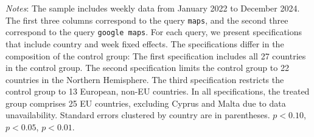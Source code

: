 \documentclass[11pt]{article}
\begin{document}
\begin{table}[!ht]
\begin{threeparttable}
			\begin{tablenotes}
				\item \footnotesize \emph{Notes}: The sample includes weekly data from January 2022 to December 2024. The first three columns correspond to the query \texttt{maps}, and the second three correspond to the query \texttt{google maps}. For each query, we present specifications that include country and week fixed effects. The specifications differ in the composition of the control group: The first specification includes all 27 countries in the control group. The second specification limits the control group to 22 countries in the Northern Hemisphere. The third specification restricts the control group to 13 European, non-EU countries. In all specifications, the treated group comprises 25 EU countries, excluding Cyprus and Malta due to data unavailability. Standard errors clustered by country are in parentheses. \sym{*} \(p<0.10\), \sym{**} \(p<0.05\), \sym{***}  \(p<0.01\). 
			\end{tablenotes}
		\end{threeparttable}
	\end{table} 
	
	
	
\end{document}
